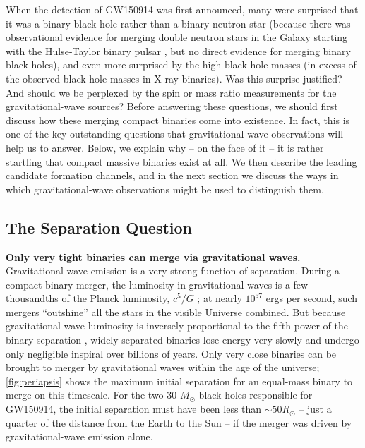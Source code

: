 \documentclass[iop,onecolumn]{revtex4}
\begin{document}
When the detection of GW150914 was first announced, many were surprised that it was a binary black hole rather than a binary neutron star (because there was observational evidence for merging double neutron stars in the Galaxy starting with the Hulse-Taylor binary pulsar \citep{HulseTaylor:1975}, but no direct evidence for merging binary black holes), and even more surprised by the high black hole masses (in excess of the observed black hole masses in X-ray binaries). Was this surprise justified? And should we be perplexed by the spin or mass ratio measurements for the gravitational-wave sources? Before answering these questions, we should first discuss how these merging compact binaries come into existence. In fact, this is one of the key outstanding questions that gravitational-wave observations will help us to answer. Below, we explain why -- on the face of it -- it is rather startling that compact massive binaries exist at all. We then describe the leading candidate formation channels, and in the next section we discuss the ways in which gravitational-wave observations might be used to distinguish them.


\subsection{The Separation Question}


\textbf{Only very tight binaries can merge via gravitational waves.} Gravitational-wave emission is a very strong function of separation. During a compact binary merger, the luminosity in gravitational waves is a few thousandths of the Planck luminosity, $c^5/G$ \citep[e.g.,][]{Cardoso:2018}; at nearly $10^{57}$ ergs per second, such mergers ``outshine'' all the stars in the visible Universe combined. But because gravitational-wave luminosity is inversely proportional to the fifth power of the binary separation \citep{Peters:1964}, widely separated binaries lose energy very slowly and undergo only negligible inspiral over billions of years. Only very close binaries can be brought to merger by gravitational waves within the age of the universe; \autoref{fig:periapsis} shows the maximum initial separation for an equal-mass binary to merge on this timescale. For the two 30 $M_\odot$ black holes responsible for GW150914, the initial separation must have been less than $\sim 50 R_\odot$ -- just a quarter of the distance from the Earth to the Sun -- if the merger was driven by gravitational-wave emission alone.
\end{document}
